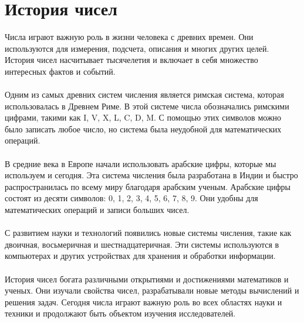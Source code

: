 \documentclass{article}
\begin{document}
\newpage
\section{История чисел}
Числа играют важную роль в жизни человека с древних времен. Они используются для измерения, подсчета, описания и многих других целей. История чисел насчитывает тысячелетия и включает в себя множество интересных фактов и событий.\\
~\\
Одним из самых древних систем числения является римская система, которая использовалась в Древнем Риме. В этой системе числа обозначались римскими цифрами, такими как I, V, X, L, C, D, M. С помощью этих символов можно было записать любое число, но система была неудобной для математических операций.\\
~\\
В средние века в Европе начали использовать арабские цифры, которые мы используем и сегодня. Эта система числения была разработана в Индии и быстро распространилась по всему миру благодаря арабским ученым. Арабские цифры состоят из десяти символов: 0, 1, 2, 3, 4, 5, 6, 7, 8, 9. Они удобны для математических операций и записи больших чисел.\\
~\\
С развитием науки и технологий появились новые системы числения, такие как двоичная, восьмеричная и шестнадцатеричная. Эти системы используются в компьютерах и других устройствах для хранения и обработки информации.\\
~\\
История чисел богата различными открытиями и достижениями математиков и ученых. Они изучали свойства чисел, разрабатывали новые методы вычислений и решения задач. Сегодня числа играют важную роль во всех областях науки и техники и продолжают быть объектом изучения исследователей.
\end{document}
